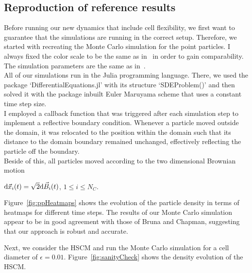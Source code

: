 \subsection{Reproduction of reference results}
Before running our new dynamics that include cell flexibility, we first want to guarantee that the simulations are running in the correct setup.
Therefore, we started with recreating the Monte Carlo simulation for the point particles. 
I always fixed the color scale to be the same as in~\cite{Bruna2012} in order to gain comparability. 
The simulation parameters are the same as in~\cite{Bruna2012}. \\
All of our simulations run in the Julia programming language. 
There, we used the package `DifferentialEquations.jl' with its structure `SDEProblem()' and then solved it with the package inbuilt Euler Maruyama scheme that uses a constant time step size. \\
I employed a callback function that was triggered after each simulation step to implement a reflective boundary condition. 
Whenever a particle moved outside the domain, it was relocated to the position within the domain such that its distance to the domain boundary remained unchanged, effectively reflecting the particle off the boundary. \\
Beside of this, all particles moved according to the two dimensional Brownian motion
\begin{center}
		$ \mathrm{d} \vec{x}_i(t) = \sqrt{2} \mathrm{d} \vec{B}_i(t)$, \hspace{0.5em} $1 \leq i \leq N_{C}$.
\end{center}
Figure~\ref{fig:ppHeatmaps} shows the evolution of the particle density in terms of heatmaps for different time steps. 
The results of our Monte Carlo simulation appear to be in good agreement with those of Bruna and Chapman, suggesting that our approach is robust and accurate.

Next, we consider the HSCM and run the Monte Carlo simulation for a cell diameter of $\epsilon = 0.01$. 
Figure~\ref{fig:sanityCheck} shows the density evolution of the HSCM.

